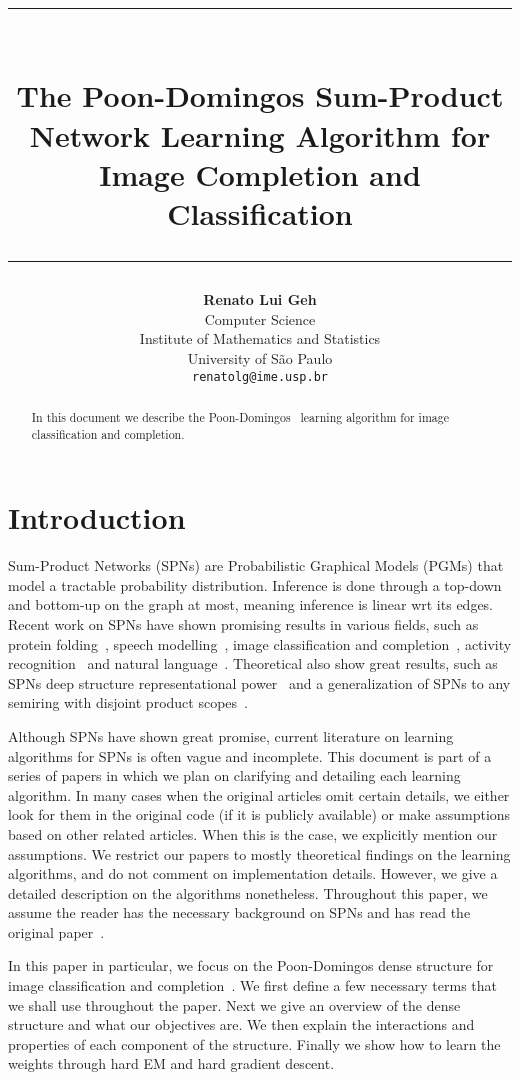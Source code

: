 \documentclass{amsart}
\title{%
  \noindent\rule{13cm}{1.0pt}\\
  \vspace{0.2cm}
  The Poon-Domingos Sum-Product Network Learning Algorithm for Image Completion and Classification
  \noindent\rule{13cm}{0.8pt}
}
\author[]{\normalsize\textbf{Renato Lui Geh}\\\small Computer Science\\Institute of Mathematics
  and Statistics\\University of São Paulo\\\texttt{renatolg@ime.usp.br}}
\theoremstyle{plain}
\numberwithin{equation}{section}
\begin{document}
\begin{abstract}
  In this document we describe the Poon-Domingos~\cite{poon-domingos} learning algorithm for image
  classification and completion.
  \vspace*{-3.5em}
\end{abstract}

\maketitle

\section{Introduction}

Sum-Product Networks (SPNs) are Probabilistic Graphical Models (PGMs) that model a tractable
probability distribution. Inference is done through a top-down and bottom-up on the graph at most,
meaning inference is linear wrt its edges. Recent work on SPNs have shown promising results in
various fields, such as protein folding~\cite{rec-dec-non-convex}, speech
modelling~\cite{model-speech}, image classification and
completion~\cite{gens-domingos,poon-domingos,clustering}, activity recognition~\cite{activity} and
natural language~\cite{nat-lang}. Theoretical also show great results, such as SPNs deep structure
representational power~\cite{shallow-vs-deep} and a generalization of SPNs to any semiring with
disjoint product scopes~\cite{sp-theorem}.

Although SPNs have shown great promise, current literature on learning algorithms for SPNs is often
vague and incomplete. This document is part of a series of papers in which we plan on clarifying
and detailing each learning algorithm. In many cases when the original articles omit certain
details, we either look for them in the original code (if it is publicly available) or make
assumptions based on other related articles. When this is the case, we explicitly mention our
assumptions. We restrict our papers to mostly theoretical findings on the learning algorithms, and
do not comment on implementation details. However, we give a detailed description on the algorithms
nonetheless. Throughout this paper, we assume the reader has the necessary background on SPNs and
has read the original paper~\cite{poon-domingos}.

In this paper in particular, we focus on the Poon-Domingos dense structure for image classification
and completion~\cite{poon-domingos}. We first define a few necessary terms that we shall use
throughout the paper. Next we give an overview of the dense structure and what our objectives are.
We then explain the interactions and properties of each component of the structure. Finally we show
how to learn the weights through hard EM and hard gradient descent.
\end{document}
